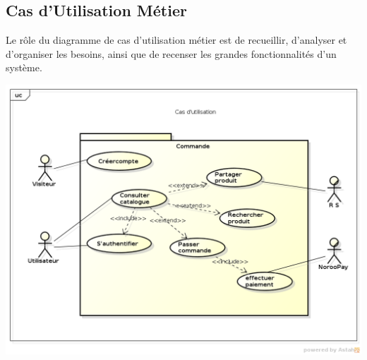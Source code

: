 \subsection{Cas d'Utilisation Métier}


Le rôle du diagramme de cas d’utilisation métier est de recueillir, d’analyser et d’organiser les besoins, ainsi que de recenser les grandes fonctionnalités d’un système. 

\begin{minipage}{1,1\textwidth}

	\includegraphics[width=0.7\linewidth]{mama/images/utilisation}
	\label{fig:utilisation}
\end{minipage}

